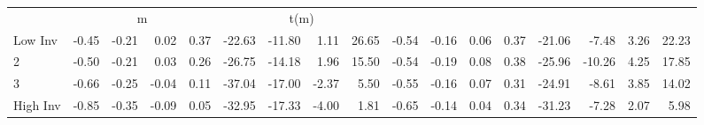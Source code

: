 \begin{table}[!ht]
\begin{tabular}{lrrrrrrrrrrrrrrrr}
      & \multicolumn{4}{c}{m} & \multicolumn{4}{c}{t(m)}
    
    \\
      \cmidrule(r){2-5} \cmidrule(r){6-9} \cmidrule(r){10-13} \cmidrule(r){14-17}

    Low Inv   & -0.45  & -0.21  & 0.02  & 0.37  & -22.63  & -11.80  & 1.11  & 26.65  & -0.54  & -0.16  & 0.06  & 0.37  & -21.06  & -7.48  & 3.26  & 22.23  \\
           2  & -0.50  & -0.21  & 0.03  & 0.26  & -26.75  & -14.18  & 1.96  & 15.50  & -0.54  & -0.19  & 0.08  & 0.38  & -25.96  & -10.26  & 4.25  & 17.85  \\
           3  & -0.66  & -0.25  & -0.04  & 0.11  & -37.04  & -17.00  & -2.37  & 5.50  & -0.55  & -0.16  & 0.07  & 0.31  & -24.91  & -8.61  & 3.85  & 14.02  \\
    High Inv  & -0.85  & -0.35  & -0.09  & 0.05  & -32.95  & -17.33  & -4.00  & 1.81  & -0.65  & -0.14  & 0.04  & 0.34  & -31.23  & -7.28  & 2.07  & 5.98  \\

  

  \bottomrule
\end{tabular}
\label{tbl:32_Size_BMm_Prior_F17}
\end{table}